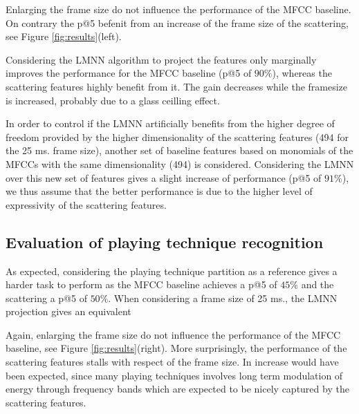 \documentclass{article}
\makeatletter
\newcommand*{\ie}{i.e.\@\xspace}
\makeatother
\begin{document}
Enlarging the frame size do not influence the performance of the MFCC baseline. On contrary the p@5 befenit from an increase of the frame size of the scattering, see Figure \ref{fig:results}(left).

Considering the LMNN algorithm to project the features only marginally improves the performance for the MFCC baseline (p@5 of $90\%$), whereas the scattering features highly benefit from it. The gain decreases while the framesize is increased, probably due to a glass ceilling effect.

In order to control if the LMNN artificially benefits from the higher degree of freedom provided by the higher dimensionality of the scattering features (494 for the 25 ms. frame size), another set of baseline features based on monomials of the MFCCs with the same dimensionality (494) is considered. Considering the LMNN over this new set of features gives a slight increase of performance (p@5 of $91\%$), we thus assume that the better performance is due to the higher level of expressivity of the scattering features.

\subsection{Evaluation of playing technique recognition}

As expected, considering the playing technique partition as a reference gives a harder task to perform as the  MFCC baseline achieves a p@5 of $45\%$ and the scattering a p@5 of $50\%$.
When considering a frame size of 25 ms., the LMNN projection gives an equivalent


Again, enlarging the frame size do not influence the performance of the MFCC baseline, see Figure \ref{fig:results}(right). More surprisingly, the performance of the scattering features stalls with respect of the frame size. In increase would have been expected, since many playing techniques involves long term modulation of energy through frequency bands which are expected to be nicely captured by the scattering features.
\end{document}
